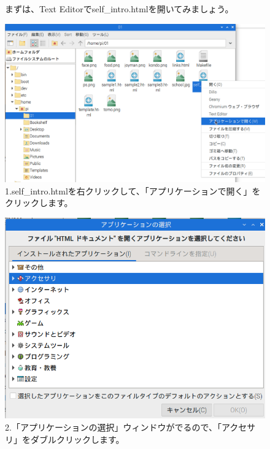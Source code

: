 \documentclass[a4paper,12pt]{jarticle}
\begin{document}
\begin{figure}[ht]
  \begin{minipage}{\textwidth}
    \flushleft
    まずは、Text
    Editorでself\_intro.htmlを開いてみましょう。
    \begin{minipage}{0.45\linewidth}
      \includegraphics[width=\linewidth]{textbook-img1040.png}\\
      1.self\_intro.htmlを右クリックして、「アプリケーションで開く」をクリックします。
    \end{minipage}
    \hfill
    \vspace{20pt}
    \begin{minipage}{0.45\linewidth}
      \includegraphics[width=\linewidth]{textbook-img1041.png}\\
      2.「アプリケーションの選択」ウィンドウがでるので、「アクセサリ」をダブルクリックします。
    \end{minipage}

\end{minipage}
\end{figure}
\end{document}
